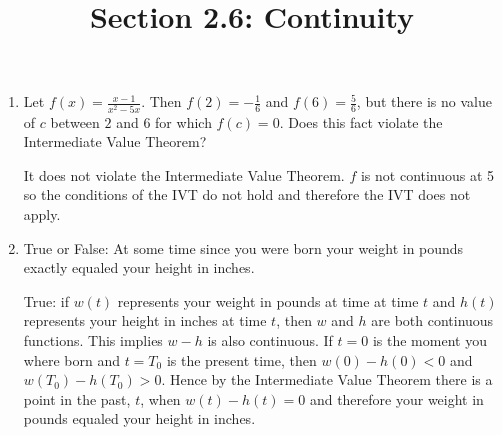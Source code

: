 \documentclass[nooutcomes]{ximera}
\title{Section 2.6: Continuity}
\begin{document}
\begin{abstract}		\end{abstract}
\maketitle

\begin{problem}
	\begin{enumerate}
   	\item  Let $f(x) = \frac{x-1}{x^2 - 5x}$.  Then $f(2)=-\frac{1}{6}$ and $f(6)=\frac{5}{6}$, but there is no value of $c$ between $2$ and $6$ for which $f(c)=0$.  Does this fact violate the Intermediate Value Theorem?

      \begin{freeResponse}
        It does not violate the Intermediate Value Theorem.  $f$ is not continuous at 5 so the conditions of the IVT do not hold and therefore the IVT does not apply.
      \end{freeResponse}

	\item	True or False: At some time since you were born your weight in pounds exactly equaled your height in inches.
      \begin{freeResponse}
        True: if $w(t)$ represents your weight in pounds at time at time $t$ and $h(t)$ represents your height in inches at time $t$, then $w$ and $h$ are both continuous functions.  This implies $w - h$ is also continuous.
        If $t = 0$ is the moment you where born and $t = T_0$ is the present time, then $w(0) - h(0) < 0$ and $w(T_0) - h(T_0) > 0$.
        Hence by the Intermediate Value Theorem there is a point in the past, $t$, when $w(t)-h(t)=0$ and therefore your weight in pounds equaled your height in inches.
      \end{freeResponse}
	
	\end{enumerate}

\end{problem}
\end{document}
